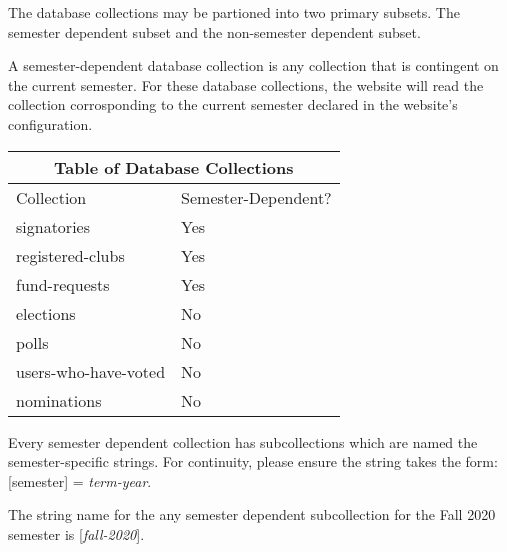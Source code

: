 \documentclass[a4paper]{article}
\begin{document}
The database collections may be partioned into two primary subsets. The semester dependent subset and the non-semester dependent subset.

\begin{definition*}
A semester-dependent database collection is any collection that is contingent on the current semester. For these database collections, the website will read the collection corrosponding to the current semester declared in the website's configuration.
\end{definition*}

\begin{center}
\begin{tabular}{ |p{4cm}||p{4cm}|  }
 \hline
 \multicolumn{2}{|c|}{Table of Database Collections} \\
 \hline
 Collection & Semester-Dependent? \\
 \hline
 signatories & Yes \\
 registered-clubs & Yes \\
 fund-requests & Yes \\
 \hline
 elections & No \\
 polls & No \\
 users-who-have-voted & No \\
 nominations & No \\
 \hline
\end{tabular}
\end{center}

%

\begin{note*}
Every semester dependent collection has subcollections which are named the semester-specific strings. For continuity, please ensure the string takes the form: [semester] = \textit{term-year}.
\end{note*}

\begin{example*}
The string name for the any semester dependent subcollection for the Fall 2020 semester is [\textit{fall-2020}].
\end{example*}
\end{document}
